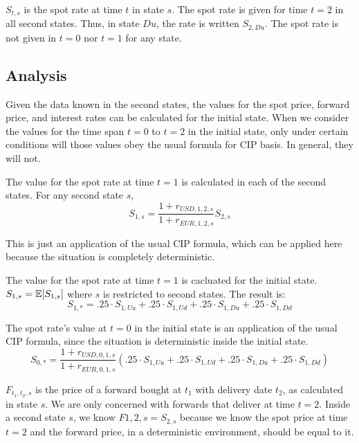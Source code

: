 $S_{t,s}$ is the spot rate at time $t$ in state $s$.  The spot rate is given for time $t=2$ in all second states.  Thus, in state $Du$, the rate is written $S_{2,Du}$.  The spot rate is not given in $t=0$ nor $t=1$ for any state.


\subsection{Analysis}

Given the data known in the second states, the values for the spot price, forward price, and interest rates can be calculated for the initial state.  When we consider the values for the time span $t=0$ to $t=2$ in the initial state, only under certain conditions will those values obey the usual formula for CIP basis.  In general, they will not.

The value for the spot rate at time $t=1$ is calculated in each of the second states.  For any second state $s$, 
\begin{equation}
  S_{1,s} = \frac{1+r_{USD,1,2,s}}{1 + r_{EUR,1,2,s}} S_{2,s}
\end{equation}

\noindent This is just an application of the usual CIP formula, which can be applied here because the situation is completely deterministic.  

The value for the spot rate at time $t=1$ is cacluated for the initial state.  $S_{1,*} = \operatorname{\mathbb{E}}[S_{1,s}]$ where $s$ is restricted to second states.  The result is:
\begin{equation}
  S_{1,*} = . 25\cdot S_{1,Uu} + .25\cdot S_{1,Ud} + .25\cdot S_{1,Du} + .25\cdot S_{1,Dd} 
\end{equation}

The spot rate's value at $t=0$ in the initial state is an application of the usual CIP formula, since the situation is deterministic inside the initial state.
\begin{equation}
  S_{0,*} = \frac{1+r_{USD,0,1,s}}{1 + r_{EUR,0,1,s}}(. 25\cdot S_{1,Uu} + .25\cdot S_{1,Ud} + .25\cdot S_{1,Du} + .25\cdot S_{1,Dd})
\end{equation}

$F_{t_1,t_2,s}$ is the price of a forward bought at $t_1$ with delivery date $t_2$, as calculated in state $s$.  We are only concerned with forwards that deliver at time $t=2$.  Inside a second state $s$, we know $F{1,2,s} = S_{2,s}$ because we know the spot price at time $t=2$ and the forward price, in a deterministic environment, should be equal to it.

